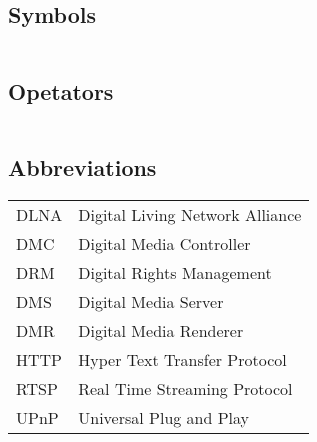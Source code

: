 
\subsection*{Symbols}

\begin{tabular}{ll}

\end{tabular}

\subsection*{Opetators} 

\begin{tabular}{ll}

\end{tabular}

\subsection*{Abbreviations}

\begin{tabular}{ll}
DLNA       & Digital Living Network Alliance\label{dlna_shortfor} \\ 
DMC        & Digital Media Controller \\
DRM        & Digital Rights Management \\ 
DMS        & Digital Media Server \\
DMR        & Digital Media Renderer \\
HTTP       & Hyper Text Transfer Protocol \\
RTSP       & Real Time Streaming Protocol \\ 
UPnP	   & Universal Plug and Play \label{upnp_shortfor} \\
\end{tabular}
